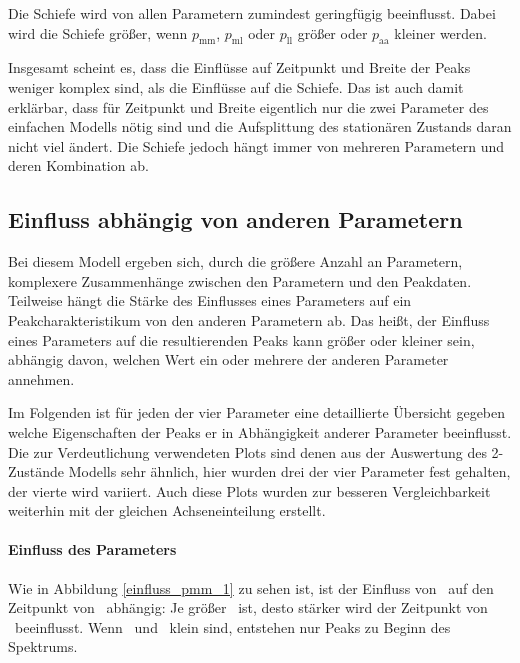 Die Schiefe wird von allen Parametern zumindest geringfügig beeinflusst. Dabei wird die Schiefe größer, wenn $p_{\text{mm}}$, $p_{\text{ml}}$ oder $p_{\text{ll}}$ größer oder $p_{\text{aa}}$ kleiner werden.


Insgesamt scheint es, dass die Einflüsse auf Zeitpunkt und Breite der Peaks weniger komplex sind, als die Einflüsse auf die Schiefe. Das ist auch damit erklärbar, dass für Zeitpunkt und Breite eigentlich nur die zwei Parameter des einfachen Modells nötig sind und die Aufsplittung des stationären Zustands daran nicht viel ändert. Die Schiefe jedoch hängt immer von mehreren Parametern und deren Kombination ab.

\subsection{Einfluss abhängig von anderen Parametern}

Bei diesem Modell ergeben sich, durch die größere Anzahl an Parametern, komplexere Zusammenhänge zwischen den Parametern und den Peakdaten. Teilweise hängt die Stärke des Einflusses eines Parameters auf ein Peakcharakteristikum von den anderen Parametern ab. Das heißt, der Einfluss eines Parameters auf die resultierenden Peaks kann größer oder kleiner sein, abhängig davon, welchen Wert ein oder mehrere der anderen Parameter annehmen.


Im Folgenden ist für jeden der vier Parameter eine detaillierte Übersicht gegeben welche Eigenschaften der Peaks er in Abhängigkeit anderer Parameter beeinflusst. Die zur Verdeutlichung verwendeten Plots sind denen aus der Auswertung des 2-Zustände Modells sehr ähnlich, hier wurden drei der vier Parameter fest gehalten, der vierte wird variiert. Auch diese Plots wurden zur besseren Vergleichbarkeit weiterhin mit der gleichen Achseneinteilung erstellt. 

\clearpage

\paragraph*{Einfluss des Parameters \pmm}
Wie in Abbildung \ref{einfluss_pmm_1} zu sehen ist, ist der Einfluss von \pmm\ auf den Zeitpunkt von \paa\ abhängig: Je größer \paa\ ist, desto stärker wird der Zeitpunkt von \pmm\ beeinflusst. Wenn \pmm\ und \paa\ klein sind, entstehen nur Peaks zu Beginn des Spektrums.%

